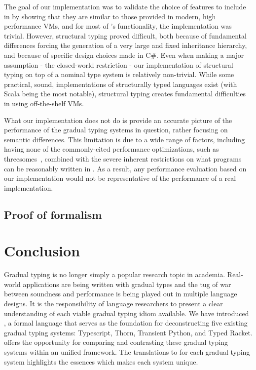 \documentclass[acmlarge, anonymous, authordraft]{acmart}
\begin{document}
The goal of our implementation was to validate the choice of features to
include in \kafka by showing that they are similar to those provided in
modern, high performance VMs, and for most of \kafka's functionality, the
implementation was trivial. However, structural typing proved difficult, both
because of fundamental differences forcing the generation of a very large and
fixed inheritance hierarchy, and because of specific design choices made in
C\#. Even when making a major assumption - the closed-world restriction - our
implementation of structural typing on top of a nominal type system is
relatively non-trivial. While some practical, sound, implementations of
structurally typed languages exist (with Scala being the most notable),
structural typing creates fundamental difficulties in using off-the-shelf VMs.

What our implementation does not do is provide an accurate picture of the
performance of the gradual typing systems in question, rather focusing on
semantic differences. This limitation is due to a wide range of factors,
including having none of the commonly-cited performance optimizations, such as
threesomes~\cite{siek10}, combined with the severe inherent restrictions on
what programs can be reasonably written in \kafka. As a result, any
performance evaluation based on our \kafka implementation would not be
representative of the performance of a real implementation. %

\subsection{Proof of formalism}

\section{Conclusion}

Gradual typing is no longer simply a popular research topic in academia.
Real-world applications are being written with gradual types and the tug of
war between soundness and performance is being played out in multiple
language designs.  It is the responsibility of language researchers to
present a clear understanding of each viable gradual typing idiom available.
We have introduced \kafka, a formal language that serves as the foundation
for deconstructing five existing gradual typing systems: Typescript, Thorn,
Transient Python, and Typed Racket.
\kafka offers the
opportunity for comparing and contrasting these gradual typing systems
within an unified framework. The translations to \kafka for each gradual
typing system highlights the essences which makes each system unique.
\end{document}

